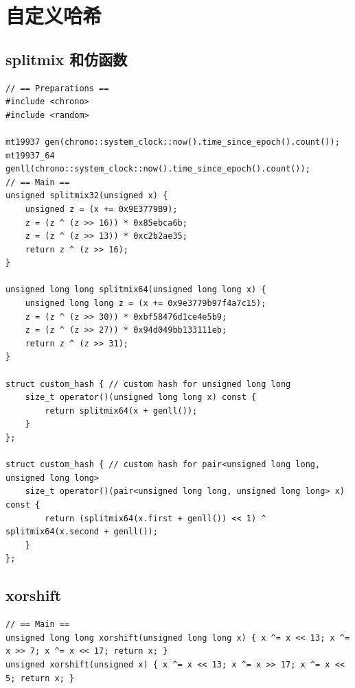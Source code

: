 \section{自定义哈希}

\subsection{splitmix 和仿函数}

\begin{verbatim}
// == Preparations ==
#include <chrono>
#include <random>

mt19937 gen(chrono::system_clock::now().time_since_epoch().count());
mt19937_64 genll(chrono::system_clock::now().time_since_epoch().count());
// == Main ==
unsigned splitmix32(unsigned x) {
    unsigned z = (x += 0x9E3779B9);
    z = (z ^ (z >> 16)) * 0x85ebca6b;
    z = (z ^ (z >> 13)) * 0xc2b2ae35;
    return z ^ (z >> 16);
}

unsigned long long splitmix64(unsigned long long x) {
    unsigned long long z = (x += 0x9e3779b97f4a7c15);
    z = (z ^ (z >> 30)) * 0xbf58476d1ce4e5b9;
    z = (z ^ (z >> 27)) * 0x94d049bb133111eb;
    return z ^ (z >> 31);
}

struct custom_hash { // custom hash for unsigned long long
    size_t operator()(unsigned long long x) const {
        return splitmix64(x + genll());
    }
};

struct custom_hash { // custom hash for pair<unsigned long long, unsigned long long>
    size_t operator()(pair<unsigned long long, unsigned long long> x) const {
        return (splitmix64(x.first + genll()) << 1) ^ splitmix64(x.second + genll());
    }
};
\end{verbatim}

\subsection{xorshift}

\begin{verbatim}
// == Main ==
unsigned long long xorshift(unsigned long long x) { x ^= x << 13; x ^= x >> 7; x ^= x << 17; return x; }
unsigned xorshift(unsigned x) { x ^= x << 13; x ^= x >> 17; x ^= x << 5; return x; }
\end{verbatim}